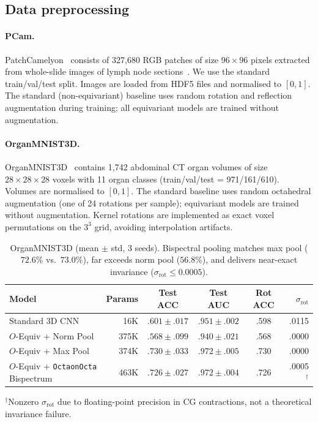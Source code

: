 \documentclass{article}
\theoremstyle{definition}
\theoremstyle{remark}
\theoremstyle{definition}
\begin{document}
\subsection{Data preprocessing}

\paragraph{PCam.}
PatchCamelyon~\citep{veeling2018rotation} consists of 327{,}680 RGB
patches of size $96 \times 96$ pixels extracted from whole-slide
images of lymph node sections~\citep{bejnordi2017camelyon}. We use
the standard train/val/test split. Images are loaded from HDF5 files
and normalised to $[0, 1]$. The standard (non-equivariant) baseline
uses random rotation and reflection augmentation during training; all
equivariant models are trained without augmentation.

\paragraph{OrganMNIST3D.}
OrganMNIST3D~\citep{medmnistv2} contains 1{,}742 abdominal CT organ
volumes of size $28 \times 28 \times 28$ voxels with 11 organ classes
(train/val/test = 971/161/610). Volumes are normalised to $[0, 1]$.
The standard baseline uses random octahedral augmentation (one of 24
rotations per sample); equivariant models are trained without
augmentation. Kernel rotations are implemented as exact voxel
permutations on the $3^3$ grid, avoiding interpolation artifacts.

\begin{table}[h]
  \caption{OrganMNIST3D (mean $\pm$ std, 3 seeds). Bispectral pooling
    matches max pool ($72.6\%$ vs.\ $73.0\%$), far exceeds norm pool
    ($56.8\%$), and delivers near-exact invariance
    ($\sigma_{\mathrm{rot}} \le 0.0005$).}
  \label{tab:organ3d-results}
  \centering
  \small
  \begin{tabular}{lrcccr}
    \toprule
    Model & Params & Test ACC & Test AUC & Rot ACC & $\sigma_{\mathrm{rot}}$ \\
    \midrule
    Standard 3D CNN          & 16K  & $.601 \pm .017$ & $.951 \pm .002$ & .598 & .0115 \\
    $O$-Equiv + Norm Pool    & 375K & $.568 \pm .099$ & $.940 \pm .021$ & .568 & .0000 \\
    $O$-Equiv + Max Pool     & 374K & $.730 \pm .033$ & $.972 \pm .005$ & .730 & .0000 \\
    $O$-Equiv + \texttt{OctaonOcta} Bispectrum   & 463K & $.726 \pm .027$ & $.972 \pm .004$ & .726 & .0005$^\dagger$ \\
    \bottomrule
  \end{tabular}

  \vspace{0.3em}
  {\small $^\dagger$Nonzero $\sigma_{\mathrm{rot}}$ due to floating-point precision in CG contractions, not a theoretical invariance failure.}
\end{table}
\end{document}
